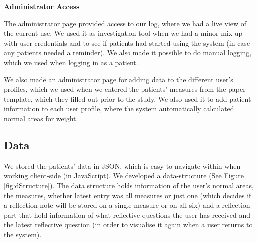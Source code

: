 \textbf{Administrator Access}

The administrator page provided access to our log, where we had a live view of the current use. We used it as investigation tool when we had a minor mix-up with user credentials and to see if patients had started using the system (in case any patients needed a reminder). We also made it possible to do manual logging, which we used when logging in as a patient.

We also made an administrator page for adding data to the different user's profiles, which we used when we entered the patients' measures from the paper template, which they filled out prior to the study. We also used it to add patient information to each user profile, where the system automatically calculated normal areas for weight. 


\subsection{Data}
We stored the patients' data in JSON, which is easy to navigate within when working client-side (in JavaScript). We developed a data-structure (See Figure \ref{fig:dStructure}). The data structure holds information of the user's normal areas, the measures, whether latest entry was all measures or just one (which decides if a reflection note will be stored on a single measure or on all six) and a reflection part that hold information of what reflective questions the user has received and the latest reflective question (in order to visualise it again when a user returns to the system).

